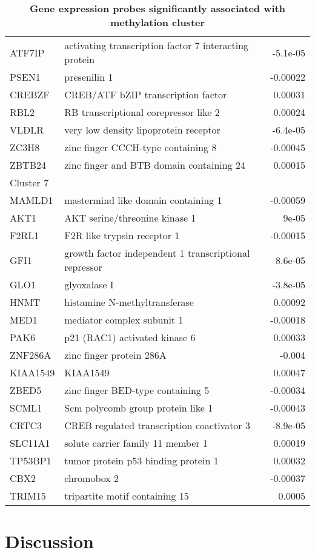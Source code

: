 \documentclass{article}
\begin{document}
\begin{table*}[ht!]
\begin{tabular}{llr}
  ATF7IP & activating transcription factor 7 interacting protein & -5.1e-05 \\ 
  PSEN1 & presenilin 1 & -0.00022 \\ 
  CREBZF & CREB/ATF bZIP transcription factor & 0.00031 \\ 
  RBL2 & RB transcriptional corepressor like 2 & 0.00024 \\ 
  VLDLR & very low density lipoprotein receptor & -6.4e-05 \\ 
  ZC3H8 & zinc finger CCCH-type containing 8 & -0.00045 \\ 
  ZBTB24 & zinc finger and BTB domain containing 24 & 0.00015 \\ 
  \midrule
  Cluster 7 \\
  \midrule
  MAMLD1 & mastermind like domain containing 1 & -0.00059 \\ 
  AKT1 & AKT serine/threonine kinase 1 & 9e-05 \\ 
  F2RL1 & F2R like trypsin receptor 1 & -0.00015 \\ 
  GFI1 & growth factor independent 1 transcriptional repressor & 8.6e-05 \\ 
  GLO1 & glyoxalase I & -3.8e-05 \\ 
  HNMT & histamine N-methyltransferase & 0.00092 \\ 
  MED1 & mediator complex subunit 1 & -0.00018 \\ 
  PAK6 & p21 (RAC1) activated kinase 6 & 0.00033 \\ 
  ZNF286A & zinc finger protein 286A & -0.004 \\ 
  KIAA1549 & KIAA1549 & 0.00047 \\ 
  ZBED5 & zinc finger BED-type containing 5 & -0.00034 \\ 
  SCML1 & Scm polycomb group protein like 1 & -0.00043 \\ 
  CRTC3 & CREB regulated transcription coactivator 3 & -8.9e-05 \\ 
  SLC11A1 & solute carrier family 11 member 1 & 0.00019 \\ 
  TP53BP1 & tumor protein p53 binding protein 1 & 0.00032 \\ 
  CBX2 & chromobox 2 & -0.00037 \\ 
  TRIM15 & tripartite motif containing 15 & 0.0005 \\ 
   \bottomrule
\end{tabular}
\label{genes}
\caption{\textbf{Gene expression probes significantly associated with methylation cluster}}
\end{table*}

\section{Discussion}



\end{document}
